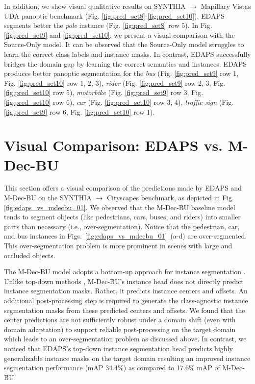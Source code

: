 \documentclass[10pt,twocolumn,letterpaper]{article}
\begin{document}
In addition, we show visual qualitative results on SYNTHIA $\rightarrow$ Mapillary Vistas UDA panoptic benchmark 
(Fig. \ref{fig:pred_set8}-\ref{fig:pred_set10}).
EDAPS segments better the \emph{pole} instance (Fig. \ref{fig:pred_set8} row $5$).
In Fig. \ref{fig:pred_set9} and \ref{fig:pred_set10}, we present a visual comparison 
with the Source-Only model.
It can be observed that the Source-Only model struggles to learn the correct class labels and instance masks. In contrast, EDAPS successfully bridges the domain gap by learning the correct semantics and instances.
EDAPS produces better panoptic segmentation for 
the \emph{bus} (Fig. \ref{fig:pred_set9} row 1, Fig. \ref{fig:pred_set10} row 1, 2, 3),
\emph{rider} (Fig. \ref{fig:pred_set9} row 2, 3, Fig. \ref{fig:pred_set10} row 5),
\emph{motorbike} (Fig. \ref{fig:pred_set9} row 3, Fig. \ref{fig:pred_set10} row 6),
\emph{car} (Fig. \ref{fig:pred_set10} row 3, 4),
\emph{traffic sign} (Fig. \ref{fig:pred_set9} row 6, Fig. \ref{fig:pred_set10} row 1).

\section{Visual Comparison: EDAPS vs. M-Dec-BU}
\label{sec:mdecbu-analysis}
This section offers a visual comparison of the predictions made by EDAPS and M-Dec-BU on the SYNTHIA $\rightarrow$ Cityscapes benchmark, as depicted in Fig. \ref{fig:edaps_vs_mdecbu_01}.
We observed that the M-Dec-BU baseline model tends to segment objects (like 
pedestrians, cars, buses, and riders) into smaller parts than necessary (i.e., over-segmentation).
Notice that the pedestrian, car, and bus instances in Figs.~\ref{fig:edaps_vs_mdecbu_01}~(a-d) are over-segmented.
This over-segmentation problem is more prominent in scenes  with large and occluded objects.


The M-Dec-BU model adopts a bottom-up approach for instance segmentation \cite{cheng2019panoptic}.
Unlike top-down methods \cite{he2017mask}, M-Dec-BU's instance head does not directly predict instance segmentation masks.
Rather, it predicts instance centers and offsets.
An additional post-processing step is required to generate the class-agnostic instance segmentation masks 
from these predicted centers and offsets.
We found that the center predictions are not sufficiently robust under a domain shift (even with domain adaptation) to support reliable post-processing on the target domain which leads to an over-segmentation problem as discussed above.
In contrast, we noticed that EDAPS's top-down instance segmentation head 
predicts highly generalizable instance masks on the target domain
resulting an improved instance segmentation performance (mAP 34.4\%) as
compared to 17.6\% mAP of M-Dec-BU.
\end{document}
